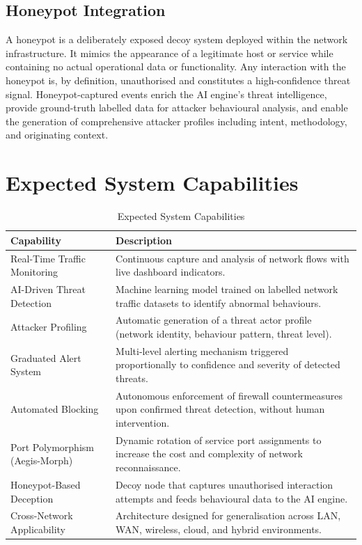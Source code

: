 \documentclass[12pt,a4paper]{report}
\begin{document}
\section{Honeypot Integration}

A honeypot is a deliberately exposed decoy system deployed within the network
infrastructure. It mimics the appearance of a legitimate host or service while containing no
actual operational data or functionality. Any interaction with the honeypot is, by definition,
unauthorised and constitutes a high-confidence threat signal. Honeypot-captured events enrich
the AI engine's threat intelligence, provide ground-truth labelled data for attacker behavioural
analysis, and enable the generation of comprehensive attacker profiles including intent,
methodology, and originating context.

\chapter{Expected System Capabilities}

\begin{table}[h!]
\centering
\caption{Expected System Capabilities}
\begin{tabular}{@{}L{5.5cm} L{9cm}@{}}
  \toprule
  \textbf{Capability} & \textbf{Description} \\
  \midrule
  Real-Time Traffic Monitoring
    & Continuous capture and analysis of network flows with live dashboard indicators. \\
  \addlinespace
  AI-Driven Threat Detection
    & Machine learning model trained on labelled network traffic datasets to identify
      abnormal behaviours. \\
  \addlinespace
  Attacker Profiling
    & Automatic generation of a threat actor profile (network identity, behaviour pattern,
      threat level). \\
  \addlinespace
  Graduated Alert System
    & Multi-level alerting mechanism triggered proportionally to confidence and severity
      of detected threats. \\
  \addlinespace
  Automated Blocking
    & Autonomous enforcement of firewall countermeasures upon confirmed threat
      detection, without human intervention. \\
  \addlinespace
  Port Polymorphism (Aegis-Morph)
    & Dynamic rotation of service port assignments to increase the cost and complexity
      of network reconnaissance. \\
  \addlinespace
  Honeypot-Based Deception
    & Decoy node that captures unauthorised interaction attempts and feeds behavioural
      data to the AI engine. \\
  \addlinespace
  Cross-Network Applicability
    & Architecture designed for generalisation across LAN, WAN, wireless, cloud, and
      hybrid environments. \\
  \bottomrule
\end{tabular}
\label{tab:capabilities}
\end{table}
\end{document}
